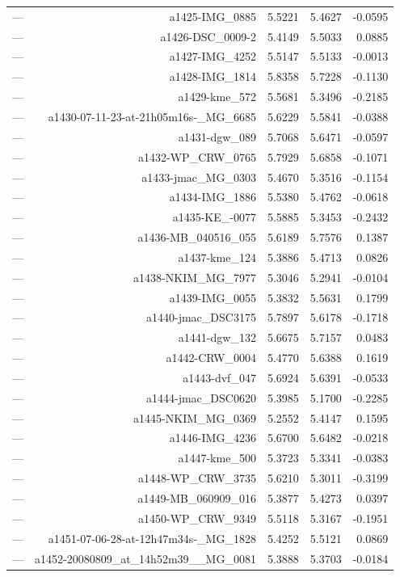 \begin{table}[htbp]
\begin{tabular}{lrrrr}
— & a1425-IMG_0885 & 5.5221 & 5.4627 & -0.0595 \\
— & a1426-DSC_0009-2 & 5.4149 & 5.5033 & 0.0885 \\
— & a1427-IMG_4252 & 5.5147 & 5.5133 & -0.0013 \\
— & a1428-IMG_1814 & 5.8358 & 5.7228 & -0.1130 \\
— & a1429-kme_572 & 5.5681 & 5.3496 & -0.2185 \\
— & a1430-07-11-23-at-21h05m16s-_MG_6685 & 5.6229 & 5.5841 & -0.0388 \\
— & a1431-dgw_089 & 5.7068 & 5.6471 & -0.0597 \\
— & a1432-WP_CRW_0765 & 5.7929 & 5.6858 & -0.1071 \\
— & a1433-jmac_MG_0303 & 5.4670 & 5.3516 & -0.1154 \\
— & a1434-IMG_1886 & 5.5380 & 5.4762 & -0.0618 \\
— & a1435-KE_-0077 & 5.5885 & 5.3453 & -0.2432 \\
— & a1436-MB_040516_055 & 5.6189 & 5.7576 & 0.1387 \\
— & a1437-kme_124 & 5.3886 & 5.4713 & 0.0826 \\
— & a1438-NKIM_MG_7977 & 5.3046 & 5.2941 & -0.0104 \\
— & a1439-IMG_0055 & 5.3832 & 5.5631 & 0.1799 \\
— & a1440-jmac_DSC3175 & 5.7897 & 5.6178 & -0.1718 \\
— & a1441-dgw_132 & 5.6675 & 5.7157 & 0.0483 \\
— & a1442-CRW_0004 & 5.4770 & 5.6388 & 0.1619 \\
— & a1443-dvf_047 & 5.6924 & 5.6391 & -0.0533 \\
— & a1444-jmac_DSC0620 & 5.3985 & 5.1700 & -0.2285 \\
— & a1445-NKIM_MG_0369 & 5.2552 & 5.4147 & 0.1595 \\
— & a1446-IMG_4236 & 5.6700 & 5.6482 & -0.0218 \\
— & a1447-kme_500 & 5.3723 & 5.3341 & -0.0383 \\
— & a1448-WP_CRW_3735 & 5.6210 & 5.3011 & -0.3199 \\
— & a1449-MB_060909_016 & 5.3877 & 5.4273 & 0.0397 \\
— & a1450-WP_CRW_9349 & 5.5118 & 5.3167 & -0.1951 \\
— & a1451-07-06-28-at-12h47m34s-_MG_1828 & 5.4252 & 5.5121 & 0.0869 \\
— & a1452-20080809_at_14h52m39__MG_0081 & 5.3888 & 5.3703 & -0.0184 \\

\end{tabular}
\end{table}
